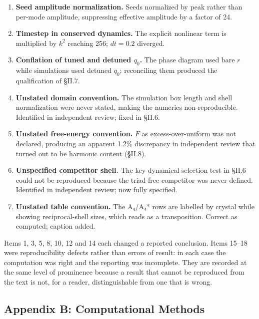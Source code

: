 \documentclass[a4paper,11pt]{article}
\begin{document}
\begin{enumerate}
\item \textbf{Seed amplitude normalization.} Seeds normalized by peak rather than per-mode amplitude, suppressing effective amplitude by a factor of 24.
\item \textbf{Timestep in conserved dynamics.} The explicit nonlinear term is multiplied by $k^2$ reaching 256; $dt=0.2$ diverged.
\item \textbf{Conflation of tuned and detuned $q_0$.} The phase diagram used bare $r$ while simulations used detuned $q_0$; reconciling them produced the qualification of §II.7.
\item \textbf{Unstated domain convention.} The simulation box length and shell normalization were never stated, making the numerics non-reproducible. Identified in independent review; fixed in §II.6.
\item \textbf{Unstated free-energy convention.} $F$ as excess-over-uniform was not declared, producing an apparent 1.2\% discrepancy in independent review that turned out to be harmonic content (§II.8).
\item \textbf{Unspecified competitor shell.} The key dynamical selection test in §II.6 could not be reproduced because the triad-free competitor was never defined. Identified in independent review; now fully specified.
\item \textbf{Unstated table convention.} The A₄/A₄* rows are labelled by crystal while showing reciprocal-shell sizes, which reads as a transposition. Correct as computed; caption added.
\end{enumerate}

Items 1, 3, 5, 8, 10, 12 and 14 each changed a reported conclusion. Items 15–18 were reproducibility defects rather than errors of result: in each case the computation was right and the reporting was incomplete. They are recorded at the same level of prominence because a result that cannot be reproduced from the text is not, for a reader, distinguishable from one that is wrong.

\subsection*{Appendix B: Computational Methods}
\end{document}
